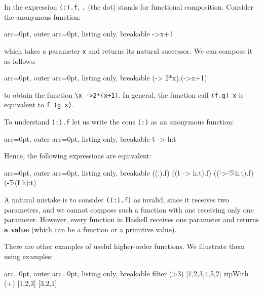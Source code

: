 In the expression \texttt{(:).f}, \texttt{.} (the dot) stands for functional composition. Consider the anonymous function:

\begin{tcblisting}{ arc=0pt, outer arc=0pt, listing only, breakable}
\x->x+1

\end{tcblisting}

which takes a parameter \texttt{x} and returns its natural successor. We can compose it as follows:

\begin{tcblisting}{ arc=0pt, outer arc=0pt, listing only, breakable}
(\x -> 2*x).(\x->x+1)

\end{tcblisting}

to obtain the function \texttt{\textbackslash x -\textgreater  2*(x+1)}. In general, the function call \texttt{(f.g) x} is equivalent to \texttt{f (g x)}.

To understand \texttt{(:).f} let us write the cons \texttt{(:)} as an anonymous function:

\begin{tcblisting}{ arc=0pt, outer arc=0pt, listing only, breakable}
\h t -> h:t

\end{tcblisting}

Hence, the following expressions are equivalent:

\begin{tcblisting}{ arc=0pt, outer arc=0pt, listing only, breakable}
((:).f)
((\h t -> h:t).f)
((\h->\t->h:t).f)
(\t->(f h):t)

\end{tcblisting}
 

A natural mistake is to consider \texttt{((:).f)} as invalid, since it receives two parameters, and we cannot compose such a function with one receiving only one parameter. However, every function in Haskell receives one parameter and returns \textbf{a value} (which can be a function or a primitive value).

There are other examples of useful higher-order functions. We illustrate them using examples:

\begin{tcblisting}{ arc=0pt, outer arc=0pt, listing only, breakable}
filter (>3) [1,2,3,4,5,2]
zipWith (+) [1,2,3] [3,2,1]

\end{tcblisting}


